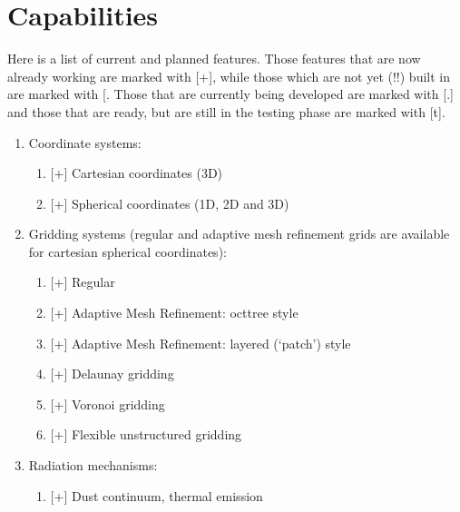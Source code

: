 \documentclass[letterpaper,10pt,english]{sphinxmanual}
\begin{document}
\section{Capabilities}
\label{\detokenize{introduction:capabilities}}
Here is a list of current and planned features. Those features that are now
already working are marked with {[}+{]}, while those which are not yet (!!) built in
are marked with {[}\sphinxhyphen{}{]}. Those that are currently being developed are marked with
{[}.{]} and those that are ready, but are still in the testing phase are marked with
{[}t{]}.
\begin{enumerate}
%
\item {} 
Coordinate systems:
\begin{enumerate}
%
\item {} 
{[}+{]} Cartesian coordinates (3\sphinxhyphen{}D)

\item {} 
{[}+{]} Spherical coordinates (1\sphinxhyphen{}D, 2\sphinxhyphen{}D and 3\sphinxhyphen{}D)

\end{enumerate}

\item {} 
Gridding systems (regular and adaptive mesh refinement grids are
available for cartesian  spherical coordinates):
\begin{enumerate}
%
\item {} 
{[}+{]} Regular

\item {} 
{[}+{]} Adaptive Mesh Refinement: oct\sphinxhyphen{}tree style

\item {} 
{[}+{]} Adaptive Mesh Refinement: layered (‘patch’) style

\item {} 
{[}+{]} Delaunay gridding

\item {} 
{[}+{]} Voronoi gridding

\item {} 
{[}+{]} Flexible unstructured gridding

\end{enumerate}

\item {} 
Radiation mechanisms:
\begin{enumerate}
%
\item {} 
{[}+{]} Dust continuum, thermal emission


\end{enumerate}
\end{enumerate}
\end{document}
